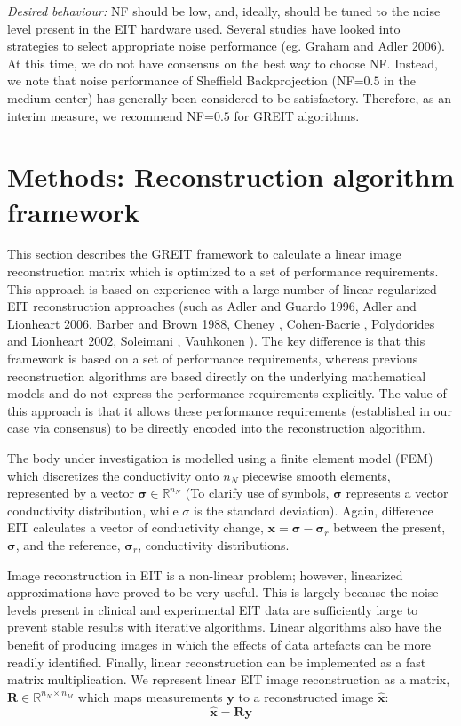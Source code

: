\documentclass[12pt]{iopart}
\newcommand{\xB}{\mbox{$\mathbf{x}$}}
\newcommand{\xH}{\mbox{$\mathbf{\hat x}$}}
\newcommand{\yB}{\mbox{$\mathbf{y}$}}
\newcommand{\RB}{\mbox{$\mathbf{R}$}}
\newcommand{\sG}{\mbox{${\boldsymbol \sigma}$}}
\begin{document}
\begin{itemize}
\hspace{5mm}
{\em Desired behaviour:}
NF should be low, and, ideally, should be tuned to the noise
level present in the EIT hardware used.
Several studies have looked into strategies to select
appropriate noise performance (eg. Graham and Adler 2006).
At this time, we do not have consensus on the best
way to choose NF. Instead, we note that noise performance
of Sheffield Backprojection (NF=$0.5$ in the medium center)
has generally been considered to be satisfactory.
Therefore, as an interim measure, we recommend NF=$0.5$
for GREIT algorithms.

\end{itemize}

\section{Methods: Reconstruction algorithm framework}

This section describes the GREIT framework to calculate
a linear image reconstruction matrix which is optimized
to a set of performance requirements. This approach
is based on experience with a large number of 
linear regularized EIT reconstruction approaches
(such as
Adler and Guardo 1996,
Adler and Lionheart 2006,
Barber and Brown 1988,
Cheney ,
Cohen-Bacrie ,
Polydorides and Lionheart 2002,
Soleimani ,
Vauhkonen ).
The key difference is that this framework
is based on a set of performance requirements, whereas
previous reconstruction algorithms are based directly on
the underlying mathematical models and do not express
the performance requirements explicitly.
The value of this approach is that it allows
these performance requirements (established in our case
via consensus) to be directly encoded into the
reconstruction algorithm.

The body under investigation is modelled using a finite element
model (FEM) which discretizes the conductivity onto $n_N$
piecewise smooth elements, represented by a vector
$\sG\in\mathbb{R}^{n_N}$ (To clarify use of symbols,
$\sG$ represents a vector conductivity distribution, while
$\sigma$ is the standard deviation).
Again, difference EIT calculates a vector of
conductivity change, $\xB = \sG - \sG_r$ between the present,
$\sG$, and the reference, $\sG_r$,
conductivity distributions.

Image reconstruction in EIT is a non-linear problem; however,
linearized approximations have proved to be very useful.
This is largely because the noise levels present in clinical
and experimental EIT data are sufficiently large
to prevent stable results with iterative algorithms.
Linear algorithms also have the benefit of producing
images in which the effects
of data artefacts can be more readily identified. Finally,
linear reconstruction can be implemented as a fast matrix
multiplication. We represent linear EIT image reconstruction
as a matrix, $\RB\in\mathbb{R}^{n_N\times n_M}$ which
maps measurements $\yB$ to a reconstructed image $\xH$:
\begin{equation} 
\label{reconst_eqn}
   \xH = \RB \yB
\end{equation} 
 
\end{document}
